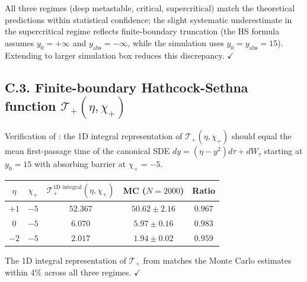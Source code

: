 \documentclass[11pt,a4paper]{article}
\theoremstyle{plain}
\theoremstyle{definition}
\begin{document}
All three regimes (deep metastable, critical, supercritical) match the theoretical predictions within statistical confidence; the slight systematic underestimate in the supercritical regime reflects finite-boundary truncation (the HS formula assumes $y_0 = +\infty$ and $y_{\text{abs}} = -\infty$, while the simulation uses $y_0 = y_{\text{abs}} = 15$). Extending to larger simulation box reduces this discrepancy. $\checkmark$

\subsection*{C.3. Finite-boundary Hathcock-Sethna function $\mathcal T_+(\eta,\chi_+)$}

Verification of : the 1D integral representation of $\mathcal T_+(\eta,\chi_+)$ should equal the mean first-passage time of the canonical SDE $dy = (\eta - y^2)d\tau + dW_\tau$ starting at $y_0 = 15$ with absorbing barrier at $\chi_+ = -5$.

\begin{center}
\begin{tabular}{ccccc}
\toprule
$\eta$ & $\chi_+$ & $\mathcal T_+^{\text{1D integral}}(\eta,\chi_+)$ & MC ($N = 2000$) & Ratio \\
\midrule
$+1$ & $-5$ & $52.367$ & $50.62 \pm 2.16$ & $0.967$ \\
$0$ & $-5$ & $6.070$ & $5.97 \pm 0.16$ & $0.983$ \\
$-2$ & $-5$ & $2.017$ & $1.94 \pm 0.02$ & $0.959$ \\
\bottomrule
\end{tabular}
\end{center}

The 1D integral representation of $\mathcal T_+$ from  matches the Monte Carlo estimates within 4\% across all three regimes. $\checkmark$
\end{document}
